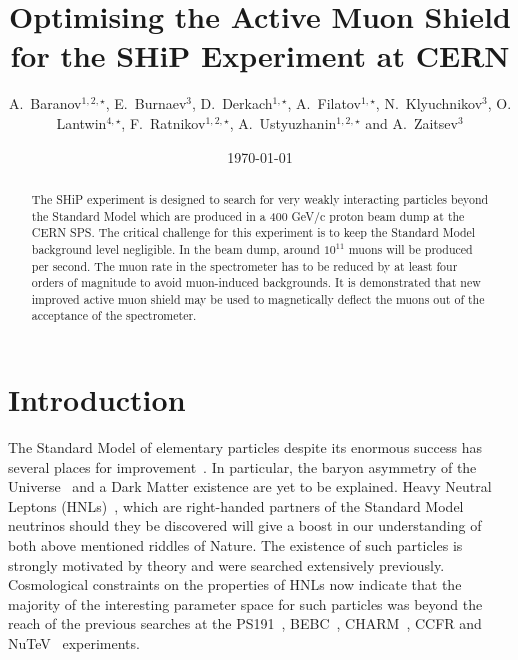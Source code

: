 \documentclass[a4paper]{jpconf}
\theoremstyle{my_theorem_style}
\numberwithin{equation}{section}
\begin{document}
\title{Optimising the Active Muon Shield for the SHiP Experiment at CERN}
\author{A.~Baranov$^{1,2,\star}$, E.~Burnaev$^{3}$,  D.~Derkach$^{1,\star}$, A.~Filatov$^{1,\star}$,
  N.~Klyuchnikov$^{3}$,  O. Lantwin$^{4,\star}$, F.~Ratnikov$^{1,2,\star}$,
  A.~Ustyuzhanin$^{1,2,\star}$  and
 A.~Zaitsev$^{3}$
}
\address{$^1$ National Research University Higher School of Economics,  Moscow, Russia \\
$^2$ Yandex School of Data Analysis, Moscow, Russia \\
$^3$ Skolkovo Institute of Science and Technology, Moscow, Russia \\
$^4$ Imperial College London, London, UK \\
$^\star$ on behalf of the SHiP Collaboration}

\begin{abstract}
The SHiP experiment is designed to search for very weakly interacting
particles beyond the Standard Model which are produced in a 400 GeV/c
proton beam dump at the CERN SPS. The critical challenge for this
experiment is to keep the Standard Model background level
negligible. In the beam dump, around $10^{11}$ muons will be produced
per second. The muon rate in the spectrometer has to be reduced by at
least four orders of magnitude to avoid muon-induced backgrounds. It
is demonstrated that new improved active muon shield may be used to magnetically deflect the muons out of the acceptance of the spectrometer.
\end{abstract}

\date{\today}



\section{Introduction}
\label{intro}
The Standard Model of elementary particles despite its enormous success has several places for improvement~\cite{Ellis:2009tp}. In particular, the baryon asymmetry of the Universe~\cite{Asaka:2005pn} and a Dark Matter existence are yet to be explained. Heavy Neutral Leptons (HNLs)~\cite{Asaka:2005an}, which are right-handed partners of the Standard Model neutrinos should they be discovered will give a boost in our understanding of both above mentioned riddles of Nature. The existence of such particles is strongly motivated by theory and were searched extensively previously. Cosmological constraints on the properties of HNLs now indicate that the majority of the interesting parameter space for such particles was beyond the reach of the previous searches at the PS191~\cite{Bernardi:1985ny}, BEBC~\cite{CooperSarkar:1985nh}, CHARM~\cite{Bergsma:1985is}, CCFR and NuTeV~\cite{Vaitaitis:1999wq} experiments. 
\end{document}
